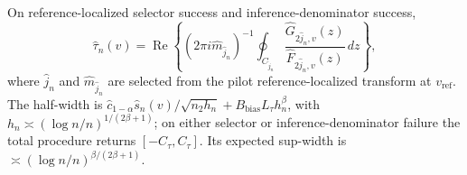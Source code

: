 On reference-localized selector success and inference-denominator success,
\[
 \widehat\tau_n(v)=\operatorname{Re}\left\{
 (2\pi i\widehat m_{\widehat j_n})^{-1}
 \oint_{C_{\widehat j_n}}
 \frac{\widehat G_{2\widehat j_n,v}(z)}
 {\widehat F_{2\widehat j_n,v}(z)}\,dz\right\},
\]
where \(\widehat j_n\) and \(\widehat m_{\widehat j_n}\) are selected from the pilot reference-localized transform at \(v_{\mathrm{ref}}\). The half-width is \(\widehat c_{1-\alpha}\widehat s_n(v)/\sqrt{n_2h_n}+B_{\mathrm{bias}}L_\tau h_n^\beta\), with \(h_n\asymp(\log n/n)^{1/(2\beta+1)}\); on either selector or inference-denominator failure the total procedure returns \([-C_\tau,C_\tau]\). Its expected sup-width is \(\asymp(\log n/n)^{\beta/(2\beta+1)}\).